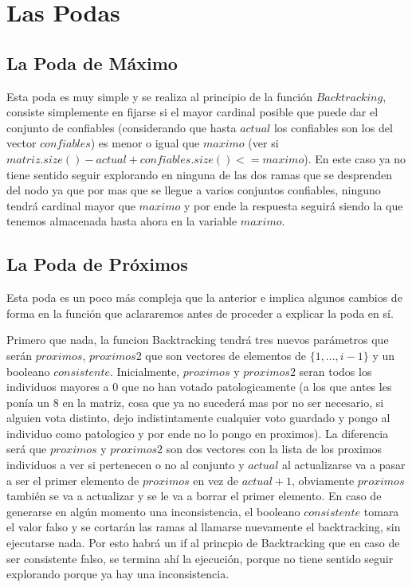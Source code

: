 \documentclass[A4paper,oneside,fleqn,10pt]{article}
\theoremstyle{definition}
\begin{document}
\section{Las Podas}
\subsection{La Poda de Máximo}
Esta poda es muy simple y se realiza al principio de la función $Backtracking$, consiste simplemente en fijarse si el mayor cardinal posible que puede dar el conjunto de confiables (considerando que hasta $actual$ los confiables son los del vector $confiables$) es menor o igual que $maximo$ (ver si $matriz.size()-actual+confiables.size()<=maximo$). En este caso ya no tiene sentido seguir explorando en ninguna de las dos ramas que se desprenden del nodo ya que por mas que se llegue a varios conjuntos confiables, ninguno tendrá cardinal mayor que $maximo$ y por ende la respuesta seguirá siendo la que tenemos almacenada hasta ahora en la variable $maximo$.
\subsection{La Poda de Próximos}
Esta poda es un poco más compleja que la anterior e implica algunos cambios de forma en la función que aclararemos antes de proceder a explicar la poda en sí.

 Primero que nada, la funcion Backtracking tendrá tres nuevos parámetros que serán $proximos$, $proximos2$ que son vectores de elementos de $\{1,...,i-1\}$ y un booleano $consistente$. Inicialmente, $proximos$ y $proximos2$ seran todos los individuos mayores a $0$ que no han votado patologicamente (a los que antes les ponía un $8$ en la matriz, cosa que ya no sucederá mas por no ser necesario, si alguien vota distinto, dejo indistintamente cualquier voto guardado y pongo al individuo como patologico y por ende no lo pongo en proximos). La diferencia será que $proximos$ y $proximos2$ son dos vectores con la lista de los proximos individuos a ver si pertenecen o no al conjunto y $actual$ al actualizarse va a pasar a ser el primer elemento de $proximos$ en vez de $actual+1$, obviamente $proximos$ también se va a actualizar y se le va a borrar el primer elemento. En caso de generarse en algún momento una inconsistencia, el booleano $consistente$ tomara el valor falso y se cortarán las ramas al llamarse nuevamente el backtracking, sin ejecutarse nada. Por esto habrá un if al princpio de Backtracking que en caso de ser consistente falso, se termina ahí la ejecución, porque no tiene sentido seguir explorando porque ya hay una inconsistencia. 
 
\end{document}
